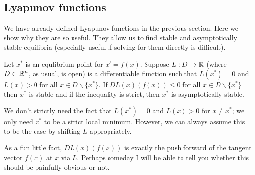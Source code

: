 \subsection{Lyapunov functions}
We have already defined Lyapunov functions in the previous section. Here we show why they are so useful. They allow us to find stable and asymptotically stable equilibria (especially useful if solving for them directly is difficult).
\begin{theorem}
Let $x^*$ is an equlibrium point for $x' = f(x)$. Suppose $L: D \to \mathbb{R}$ (where $D \subset \mathbb{R}^n$, as usual, is open) is a differentiable function such that $L(x^*) = 0$ and $L(x) > 0$ for all $x \in D \backslash \{x^*\}$. If $DL(x)(f(x)) \leq 0$ for all $x \in D \backslash \{x^*\}$ then $x^*$ is stable and if the inequality is strict, then $x^*$ is asymptotically stable.
\end{theorem}
\begin{remark}
We don't strictly need the fact that $L(x^*) = 0$ and $L(x) > 0$ for $x \neq x^*$; we only need $x^*$ to be a strict local minimum. However, we can always assume this to be the case by shifting $L$ appropriately.
\end{remark}
\begin{remark}
As a fun little fact, $DL(x)(f(x))$ is exactly the push forward of the tangent vector $f(x)$ at $x$ via $L$. Perhaps someday I will be able to tell you whether this should be painfully obvious or not.
\end{remark}
